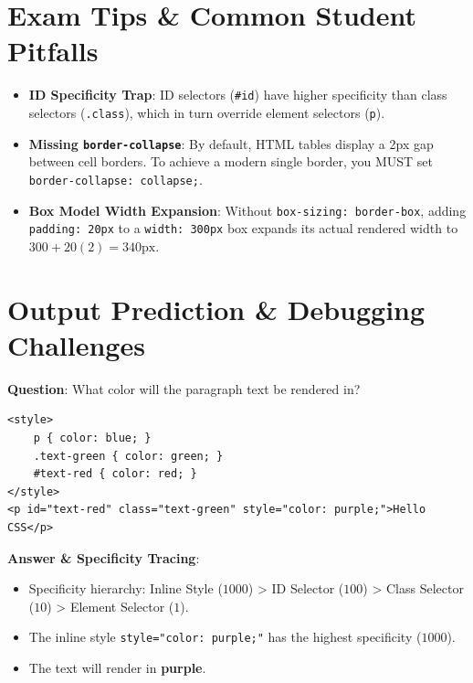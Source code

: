 \section{Exam Tips \& Common Student Pitfalls}

\begin{examtip}
\begin{itemize}[leftmargin=1.5em]
    \item \textbf{ID Specificity Trap}: ID selectors (\texttt{\#id}) have higher specificity than class selectors (\texttt{.class}), which in turn override element selectors (\texttt{p}).
    \item \textbf{Missing \texttt{border-collapse}}: By default, HTML tables display a 2px gap between cell borders. To achieve a modern single border, you MUST set \texttt{border-collapse: collapse;}.
    \item \textbf{Box Model Width Expansion}: Without \texttt{box-sizing: border-box}, adding \texttt{padding: 20px} to a \texttt{width: 300px} box expands its actual rendered width to $300 + 20(2) = 340\text{px}$.
\end{itemize}
\end{examtip}

\section{Output Prediction \& Debugging Challenges}

\begin{outputprediction}
\textbf{Question}: What color will the paragraph text be rendered in?
\begin{lstlisting}[language=HTML5]
<style>
    p { color: blue; }
    .text-green { color: green; }
    #text-red { color: red; }
</style>
<p id="text-red" class="text-green" style="color: purple;">Hello CSS</p>
\end{lstlisting}
\textbf{Answer \& Specificity Tracing}:
\begin{itemize}
    \item Specificity hierarchy: Inline Style ($1000$) > ID Selector ($100$) > Class Selector ($10$) > Element Selector ($1$).
    \item The inline style \texttt{style="color: purple;"} has the highest specificity ($1000$).
    \item The text will render in \textbf{purple}.
\end{itemize}
\end{outputprediction}

